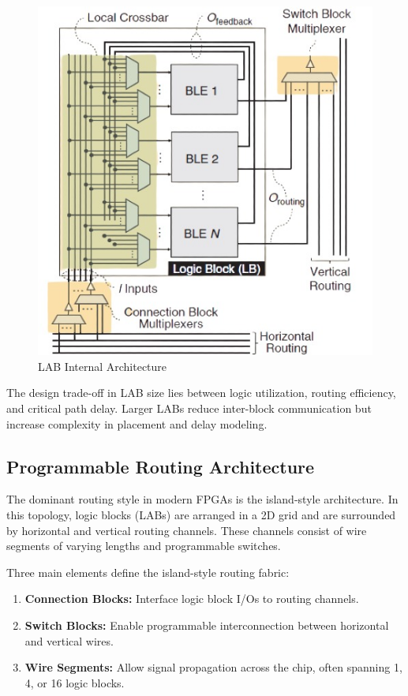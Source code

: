 \begin{figure}
	\centerline{\includegraphics[scale = 0.6]{Figures/LAB-architecture.jpg}}
	\caption{LAB Internal Architecture\cite{boutros2021fpga}}
	\label{fig:lab internal architecture}
\end{figure}

The design trade-off in LAB size lies between logic utilization, routing efficiency, and critical path delay. Larger LABs reduce inter-block communication but increase complexity in placement and delay modeling.

\subsection{Programmable Routing Architecture}
The dominant routing style in modern FPGAs is the island-style architecture. In this topology, logic blocks (LABs) are arranged in a 2D grid and are surrounded by horizontal and vertical routing channels. These channels consist of wire segments of varying lengths and programmable switches.

Three main elements define the island-style routing fabric:
\begin{enumerate}
	\item \textbf{Connection Blocks:} Interface logic block I/Os to routing channels.
	\item \textbf{Switch Blocks:} Enable programmable interconnection between horizontal and vertical wires.
	\item \textbf{Wire Segments:} Allow signal propagation across the chip, often spanning 1, 4, or 16 logic blocks.
\end{enumerate}


